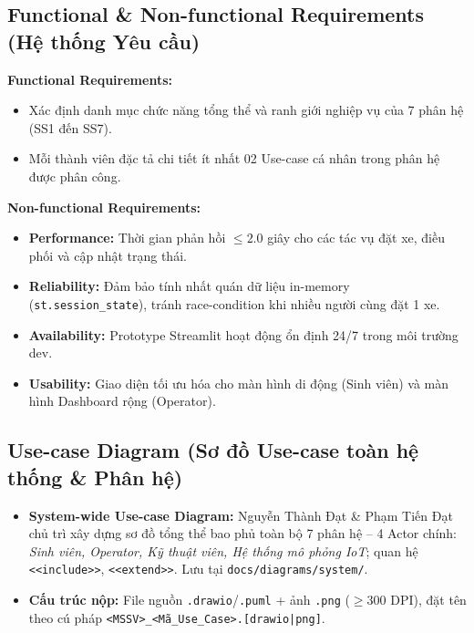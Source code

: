 \documentclass[11pt,a4paper]{article}
\begin{document}
\subsection{Functional \& Non-functional Requirements (Hệ thống Yêu cầu)}

\textbf{Functional Requirements:}
\begin{itemize}[leftmargin=2em, itemsep=2pt]
  \item Xác định danh mục chức năng tổng thể và ranh giới nghiệp vụ của 7 phân hệ (SS1 đến SS7).
  \item Mỗi thành viên đặc tả chi tiết ít nhất 02 Use-case cá nhân trong phân hệ được phân công.
\end{itemize}

\textbf{Non-functional Requirements:}
\begin{itemize}[leftmargin=2em, itemsep=2pt]
  \item \textbf{Performance:} Thời gian phản hồi $\leq 2.0$ giây cho các tác vụ đặt xe, điều phối và cập nhật trạng thái.
  \item \textbf{Reliability:} Đảm bảo tính nhất quán dữ liệu in-memory (\texttt{st.session\_state}), tránh race-condition khi nhiều người cùng đặt 1 xe.
  \item \textbf{Availability:} Prototype Streamlit hoạt động ổn định 24/7 trong môi trường dev.
  \item \textbf{Usability:} Giao diện tối ưu hóa cho màn hình di động (Sinh viên) và màn hình Dashboard rộng (Operator).
\end{itemize}

\subsection{Use-case Diagram (Sơ đồ Use-case toàn hệ thống \& Phân hệ)}

\begin{itemize}[leftmargin=2em, itemsep=2pt]
  \item \textbf{System-wide Use-case Diagram:} Nguyễn Thành Đạt \& Phạm Tiến Đạt chủ trì xây dựng sơ đồ tổng thể bao phủ toàn bộ 7 phân hệ -- 4 Actor chính: \textit{Sinh viên, Operator, Kỹ thuật viên, Hệ thống mô phỏng IoT}; quan hệ \texttt{<<include>>}, \texttt{<<extend>>}. Lưu tại \texttt{docs/diagrams/system/}.
  \item \textbf{Cấu trúc nộp:} File nguồn \texttt{.drawio}/\texttt{.puml} + ảnh \texttt{.png} ($\geq 300$ DPI), đặt tên theo cú pháp \texttt{<MSSV>\_<Mã\_Use\_Case>.[drawio|png]}.
\end{itemize}
\end{document}
